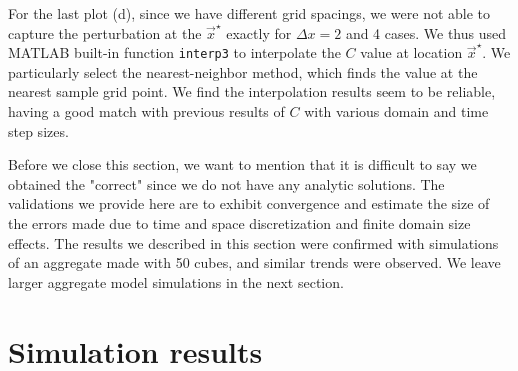 \par
For the last plot (d), since we have different grid spacings, we were not able to capture the perturbation at the $\vec{x}^{\star}$ exactly for $\Delta x = 2$ and 4 cases.  
We thus used MATLAB built-in function \verb+interp3+ to interpolate the $C$ value at location $\vec{x}^{\star}$. We particularly select the nearest-neighbor method, which finds the value at the nearest sample grid point. We find the interpolation results seem to be reliable, having a good match with previous results of $C$ with various domain and time step sizes. 

\par
\vphantom{D}
\par
Before we close this section, we want to mention that it is difficult to say we obtained the "correct" since we do not have any analytic solutions. The validations we provide here are to exhibit convergence and estimate the size of the errors made due to time and space discretization and finite domain size effects.
The results we described in this section were confirmed with simulations of an aggregate made with 50 cubes, and similar trends were observed. We leave larger aggregate model simulations in the next section.
\section{Simulation results}
\label{sec:stratified_results}
